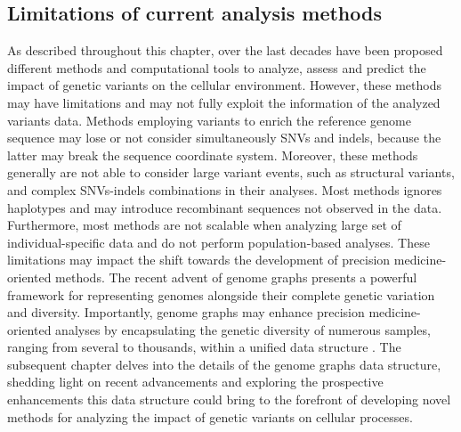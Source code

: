 \documentclass[a4paper, titlepage, openright]{book}
\begin{document}
\subsection{Limitations of current analysis methods}
As described throughout this chapter, over the last decades have been proposed different methods and computational tools to analyze, assess and predict the impact of genetic variants on the cellular environment. However, these methods may have limitations and may not fully exploit the information of the analyzed variants data. Methods employing variants to enrich the reference genome sequence may lose or not consider simultaneously SNVs and indels, because the latter may break the sequence coordinate system. Moreover, these methods generally are not able to consider large variant events, such as structural variants, and complex SNVs-indels combinations in their analyses. Most methods ignores haplotypes and may introduce recombinant sequences not observed in the data. Furthermore, most methods are not scalable when analyzing large set of individual-specific data and do not perform population-based analyses. These limitations may impact the shift towards the development of precision medicine-oriented methods. The recent advent of genome graphs \citep{paten2017genome} presents a powerful framework for representing genomes alongside their complete genetic variation and diversity. Importantly, genome graphs may enhance precision medicine-oriented analyses by encapsulating the genetic diversity of numerous samples, ranging from several to thousands, within a unified data structure \citep{yu2023human}. The subsequent chapter delves into the details of the genome graphs data structure, shedding light on recent advancements and exploring the prospective enhancements this data structure could bring to the forefront of developing novel methods for analyzing the impact of genetic variants on cellular processes.
\end{document}
